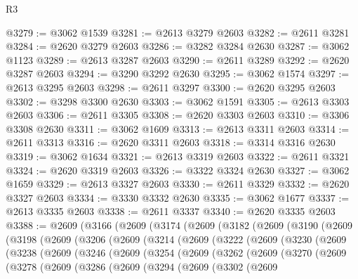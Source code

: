\begin{lexlean}{R3}
\begin{coremodule}
@3279 := @3062 @1539
@3281 := @2613 @3279 @2603
@3282 := @2611 @3281
@3284 := @2620 @3279 @2603
@3286 := @3282 @3284 @2630
@3287 := @3062 @1123
@3289 := @2613 @3287 @2603
@3290 := @2611 @3289
@3292 := @2620 @3287 @2603
@3294 := @3290 @3292 @2630
@3295 := @3062 @1574
@3297 := @2613 @3295 @2603
@3298 := @2611 @3297
@3300 := @2620 @3295 @2603
@3302 := @3298 @3300 @2630
@3303 := @3062 @1591
@3305 := @2613 @3303 @2603
@3306 := @2611 @3305
@3308 := @2620 @3303 @2603
@3310 := @3306 @3308 @2630
@3311 := @3062 @1609
@3313 := @2613 @3311 @2603
@3314 := @2611 @3313
@3316 := @2620 @3311 @2603
@3318 := @3314 @3316 @2630
@3319 := @3062 @1634
@3321 := @2613 @3319 @2603
@3322 := @2611 @3321
@3324 := @2620 @3319 @2603
@3326 := @3322 @3324 @2630
@3327 := @3062 @1659
@3329 := @2613 @3327 @2603
@3330 := @2611 @3329
@3332 := @2620 @3327 @2603
@3334 := @3330 @3332 @2630
@3335 := @3062 @1677
@3337 := @2613 @3335 @2603
@3338 := @2611 @3337
@3340 := @2620 @3335 @2603
@3388 := @2609
    (@3166
      (@2609
        (@3174
          (@2609
            (@3182
              (@2609
                (@3190
                  (@2609
                    (@3198
                      (@2609
                        (@3206
                          (@2609
                            (@3214
                              (@2609
                                (@3222
                                  (@2609
                                    (@3230
                                      (@2609
                                        (@3238
                                          (@2609
                                            (@3246
                                              (@2609
                                                (@3254
                                                  (@2609
                                                    (@3262
                                                      (@2609
                                                        (@3270
                                                          (@2609
                                                            (@3278
                                                              (@2609
                                                                (@3286
                                                                  (@2609
                                                                    (@3294
                                                                      (@2609
                                                                        (@3302
                                                                          (@2609

\end{coremodule}
\end{lexlean}
